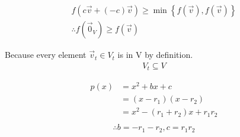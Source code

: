 \documentclass{mathtoolkit}
\begin{document}
\begin{p}
  \item
    \begin{subp}
      \item
        \begin{gather*}
          f(c \vec{v} + (-c) \vec{v}) \ge \min \left\{ f(\vec{v}), f(\vec{v}) \right\} \\
          \therefore f(\vec{0}_V) \ge f(\vec{v})
        \end{gather*}
      \item
        Because every element $\vec{v}_t \in V_t$ is in V by definition.
        \begin{gather*}
          V_t \subseteq V
        \end{gather*}
    \end{subp}

  \item
    \begin{align*}
      p(x) & = x^2 + bx +c \\
           & = (x - r_1) (x - r_2) \\
           & = x^2 - (r_1 + r_2) x + r_1 r_2 \\
    \end{align*}
    \begin{gather*}
      \therefore b = - r_1 - r_2, c = r_1 r_2 \\
    \end{gather*}


\end{p}
\end{document}

